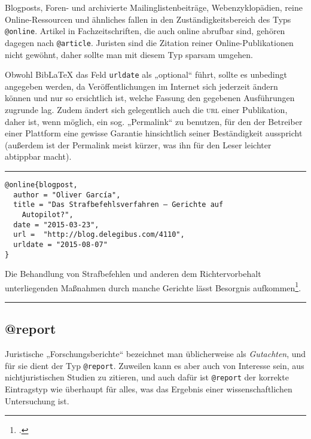 \documentclass[11pt,a4paper,DIV=calc]{scrartcl}
\newcommand\software[1]{\textsf{#1}}
\newcommand\Biblatex{\software{Bib\LaTeX{}}\xspace}
\newcommand\abbrev[1]{\textsc{#1}}
\newenvironment{rubexample}{\par\vspace{\baselineskip}\hrule\par\begin{refsection}}{\end{refsection}\par\hrule\par\vspace{\baselineskip}}
\begin{document}
Blogposts, Foren- und archivierte Mailinglistenbeiträge,
Webenzyklopädien, reine On\-line-Res\-sour\-cen und ähnliches fallen
in den Zuständigkeitsbereich des Typs \verb+@online+. Artikel in
Fachzeitschriften, die auch online abrufbar sind, gehören dagegen nach
\verb+@article+. Juristen sind die Zitation reiner
On\-line-Pu\-bli\-ka\-tio\-nen nicht gewöhnt, daher sollte man mit
diesem Typ sparsam umgehen.

Obwohl \Biblatex das Feld \verb+urldate+ als „optional“ führt, sollte
es unbedingt angegeben werden, da Veröffentlichungen im Internet sich
jederzeit ändern können und nur so ersichtlich ist, welche Fassung den
gegebenen Ausführungen zugrunde lag. Zudem ändert sich gelegentlich
auch die \abbrev{url} einer Publikation, daher ist, wenn möglich, ein
sog. „Permalink“ zu benutzen, für den der Betreiber einer Plattform
eine gewisse Garantie hinsichtlich seiner Beständigkeit ausspricht
(außerdem ist der Permalink meist kürzer, was ihn für den Leser
leichter abtippbar macht).

\begin{rubexample}
\begin{verbatim}
@online{blogpost,
  author = "Oliver García",
  title = "Das Strafbefehlsverfahren — Gerichte auf
    Autopilot?",
  date = "2015-03-23",
  url =  "http://blog.delegibus.com/4110",
  urldate = "2015-08-07"
}
\end{verbatim}

Die Behandlung von Strafbefehlen und anderen dem Richtervorbehalt
unterliegenden Maßnahmen durch manche Gerichte lässt Besorgnis
aufkommen\footcite{blogpost}.

\printbibliography
\end{rubexample}

\subsection{@report}

Juristische „Forschungsberichte“ bezeichnet man üblicherweise als
\emph{Gutachten}, und für sie dient der Typ \verb+@report+. Zuweilen
kann es aber auch von Interesse sein, aus nichtjuristischen Studien zu
zitieren, und auch dafür ist \verb+@report+ der korrekte Eintragstyp
wie überhaupt für alles, was das Ergebnis einer wissenschaftlichen
Untersuchung ist.
\end{document}
